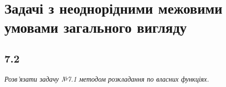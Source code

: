 \documentclass[a4paper, 14pt]{extreport}
\begin{document}
\chapter{Задачі з неоднорідними межовими умовами загального вигляду}

\section[Задача №7.2]{7.2}

\textit{Розв’язати задачу №7.1 методом розкладання по власних функціях.}
\end{document}
